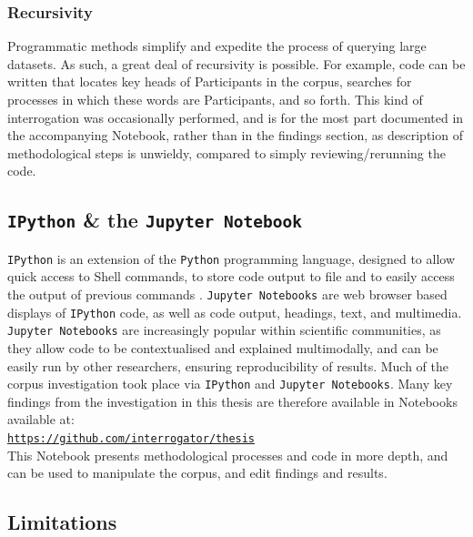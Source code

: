 \subsubsection*{Recursivity}

Programmatic methods simplify and expedite the process of querying large datasets. As such, a great deal of recursivity is possible. For example, code can be written that locates key heads of Participants in the \gls{corpus}, searches for processes in which these words are Participants, and so forth. This kind of interrogation was occasionally performed, and is for the most part documented in the accompanying Notebook, rather than in the findings section, as description of methodological steps is unwieldy, compared to simply reviewing\slash rerunning the code.

\subsection{\texttt{IPython} \& the \texttt{Jupyter Notebook}}

\texttt{IPython} is an extension of the \texttt{Python} programming language, designed to allow quick access to Shell commands, to store code output to file and to easily access the output of previous commands \cite{perez2007ipython}. \texttt{Jupyter Notebooks} are web browser based displays of \texttt{IPython} code, as well as code output, headings, text, and multimedia. \texttt{Jupyter Notebooks} are increasingly popular within scientific communities, as they allow code to be contextualised and explained multimodally, and can be easily run by other researchers, ensuring reproducibility of results. Much of the corpus investigation took place via \texttt{IPython} and \texttt{Jupyter Notebooks}. Many key findings from the investigation in this thesis are therefore available in Notebooks available at: \\ \texttt{\href{https://github.com/interrogator/thesis}{https://github.com/interrogator/thesis}} \\ This Notebook presents methodological processes and code in more depth, and can be used to manipulate the \gls{corpus}, and edit findings and results.

\subsection{Limitations}

